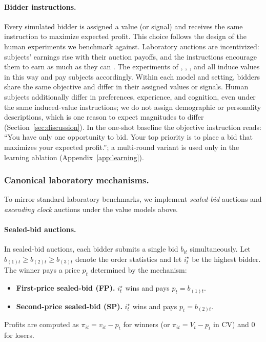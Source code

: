 \documentclass{article} %
\newif\ifmarkrev
\newcommand{\rev}[1]{\ifmarkrev\begingroup\color{red}#1\endgroup\else#1\fi}
\begin{document}
\paragraph{\rev{Bidder instructions.}}
\rev{Every simulated bidder is assigned a value (or signal) and receives the same instruction to maximize expected profit. This choice follows the design of the human experiments we benchmark against. Laboratory auctions are incentivized: subjects' earnings rise with their auction payoffs, and the instructions encourage them to earn as much as they can \citep{smith1976experimental, smith1982microeconomic}. The experiments of \citet{kagel1993independent}, \citet{li2017obviously}, \citet{breitmoser2022obviousness}, and \citet{gonczarowski2023strategyproofness} all induce values in this way and pay subjects accordingly. Within each model and setting, bidders share the same objective and differ in their assigned values or signals. Human subjects additionally differ in preferences, experience, and cognition, even under the same induced-value instructions; we do not assign demographic or personality descriptions, which is one reason to expect magnitudes to differ (Section~\ref{sec:discussion}). In the one-shot baseline the objective instruction reads: ``You have only one opportunity to bid. Your top priority is to place a bid that maximizes your expected profit.''; a multi-round variant is used only in the learning ablation (Appendix~\ref{app:learning}).}

\subsubsection{Canonical laboratory mechanisms.}
To mirror standard laboratory benchmarks, we implement \textit{sealed-bid} auctions and \textit{ascending clock} auctions under the value models above.

\paragraph{Sealed-bid auctions.}
In sealed-bid auctions, each bidder submits a single bid $b_{it}$ simultaneously. Let $b_{(1)t}\ge b_{(2)t}\ge b_{(3)t}$ denote the order statistics and let $i^\star_t$ be the highest bidder. The winner pays a price $p_t$ determined by the mechanism:
\begin{itemize}
    \item \textbf{First-price sealed-bid (FP).} $i^\star_t$ wins and pays $p_t=b_{(1)t}$.
    \item \textbf{Second-price sealed-bid (SP).} $i^\star_t$ wins and pays $p_t=b_{(2)t}$.
\end{itemize}
Profits are computed as $\pi_{it}=v_{it}-p_t$ for winners (or $\pi_{it}=V_t-p_t$ in CV) and $0$ for losers.
\end{document}
